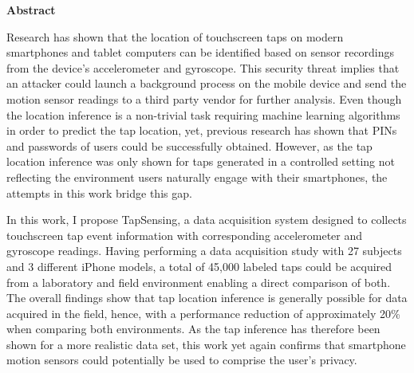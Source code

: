 \thispagestyle{empty}
\vspace*{1.0cm}

\begin{center}
    \textbf{Abstract}
\end{center}

\vspace*{0.5cm}

\noindent

Research has shown that the location of touchscreen taps on modern smartphones and tablet computers can be identified based on sensor recordings from the device's accelerometer and gyroscope. This security threat implies that an attacker could launch a background process on the mobile device and send the motion sensor readings to a third party vendor for further analysis. Even though the location inference is a non-trivial task requiring machine learning algorithms in order to predict the tap location, yet, previous research has shown that PINs and passwords of users could be successfully obtained. However, as the tap location inference was only shown for taps generated in a controlled setting not reflecting the environment users naturally engage with their smartphones, the attempts in this work bridge this gap.

In this work, I propose TapSensing, a data acquisition system designed to collects touchscreen tap event information with corresponding accelerometer and gyroscope readings. Having performing a data acquisition study with 27 subjects and 3 different iPhone models, a total of 45,000 labeled taps could be acquired from a laboratory and field environment enabling a direct comparison of both. The overall findings show that tap location inference is generally possible for data acquired in the field, hence, with a performance reduction of approximately 20\% when comparing both environments. As the tap inference has therefore been shown for a more realistic data set, this work yet again confirms that smartphone motion sensors could potentially be used to comprise the user's privacy.